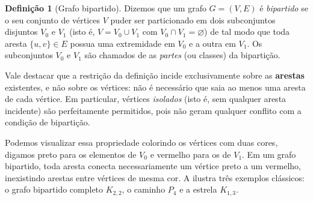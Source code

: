 \documentclass[12pt,portuguese]{article}
\theoremstyle{definition}
\newtheorem{definition}[definition]{Definição}
\let\emptyset\varnothing
\begin{document}
\begin{definition}[Grafo bipartido]\label{def:grafo-bipartido}
Dizemos que um grafo $G=(V,E)$ é \emph{bipartido} se o seu conjunto de vértices
$V$ puder ser particionado em dois subconjuntos disjuntos $V_0$ e $V_1$ (isto é,
$V=V_0\cup V_1$ com $V_0\cap V_1=\emptyset$) de tal modo que toda aresta
$\{u,v\}\in E$ possua uma extremidade em $V_0$ e a outra em $V_1$. Os
subconjuntos $V_0$ e $V_1$ são chamados de as \emph{partes} (ou classes) da
bipartição.
\end{definition}

Vale destacar que a restrição da definição incide exclusivamente sobre as
\textbf{arestas} existentes, e não sobre os vértices: não é necessário que saia
ao menos uma aresta de cada vértice. Em particular, vértices \emph{isolados}
(isto é, sem qualquer aresta incidente) são perfeitamente permitidos, pois
não geram qualquer conflito com a condição de bipartição.

Podemos visualizar essa propriedade colorindo os vértices com duas cores,
digamos preto para os elementos de $V_0$ e vermelho para os de $V_1$. Em um
grafo bipartido, toda aresta conecta necessariamente um vértice preto a um
vermelho, inexistindo arestas entre vértices de mesma cor. A
 ilustra três exemplos clássicos: o grafo bipartido
completo $K_{2,2}$, o caminho $P_4$ e a estrela $K_{1,3}$.
\end{document}
